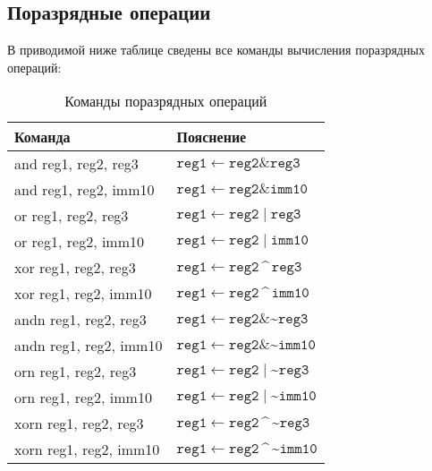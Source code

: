 \documentclass[10pt]{report}
\begin{document}
        \subsection{Поразрядные операции}
В приводимой ниже таблице сведены все команды вычисления поразрядных операций:        
\begin{table}[!h]
\caption{Команды поразрядных операций}

\begin{tabular}{|l|p{11.35cm}|}\hline 
{\textbf{Команда}}               & \textbf{Пояснение}           \\ \hline 
and reg1, reg2, reg3             & $\texttt{reg1}\leftarrow \texttt{reg2}\mathop{\textrm{\&}}\texttt{reg3}$   \\ \hline
and reg1, reg2, imm10            & $\texttt{reg1}\leftarrow \texttt{reg2}\mathop{\textrm{\&}}\texttt{imm10}$   \\ \hline
or reg1, reg2, reg3              & $\texttt{reg1}\leftarrow \texttt{reg2}\mathop{\textrm{|}}\texttt{reg3}$   \\ \hline
or reg1, reg2, imm10             & $\texttt{reg1}\leftarrow \texttt{reg2}\mathop{\textrm{|}}\texttt{imm10}$   \\ \hline
xor reg1, reg2, reg3             & $\texttt{reg1}\leftarrow \texttt{reg2}\mathop{\textrm{\textasciicircum}}\texttt{reg3}$   \\ \hline
xor reg1, reg2, imm10            & $\texttt{reg1}\leftarrow \texttt{reg2}\mathop{\textrm{\textasciicircum}}\texttt{imm10}$   \\ \hline
andn reg1, reg2, reg3            & $\texttt{reg1}\leftarrow \texttt{reg2}\mathop{\textrm{\&}}\text{\textasciitilde}\texttt{reg3}$   \\ \hline
andn reg1, reg2, imm10           & $\texttt{reg1}\leftarrow \texttt{reg2}\mathop{\textrm{\&}}\text{\textasciitilde}\texttt{imm10}$   \\ \hline
orn reg1, reg2, reg3             & $\texttt{reg1}\leftarrow \texttt{reg2}\mathop{\textrm{|}}\text{\textasciitilde}\texttt{reg3}$   \\ \hline
orn reg1, reg2, imm10            & $\texttt{reg1}\leftarrow \texttt{reg2}\mathop{\textrm{|}}\text{\textasciitilde}\texttt{imm10}$   \\ \hline
xorn reg1, reg2, reg3            & $\texttt{reg1}\leftarrow \texttt{reg2}\mathop{\textrm{\textasciicircum}}\text{\textasciitilde}\texttt{reg3}$   \\ \hline
xorn reg1, reg2, imm10           & $\texttt{reg1}\leftarrow \texttt{reg2}\mathop{\textrm{\textasciicircum}}\text{\textasciitilde}\texttt{imm10}$   \\ \hline

\end{tabular}
\end{table}
\end{document}
